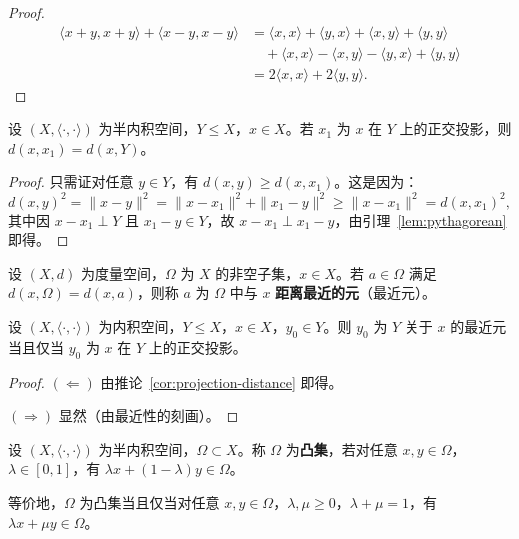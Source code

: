 \documentclass[lang=cn,a4paper,newtx,section]{elegantbook}
\begin{document}
\begin{proof}
  \begin{align*}
    \langle x+y,x+y\rangle+\langle x-y,x-y\rangle &= \langle x,x\rangle+\langle y,x\rangle+\langle x,y\rangle+\langle y,y\rangle \\
    &\quad +\langle x,x\rangle-\langle x,y\rangle-\langle y,x\rangle+\langle y,y\rangle \\
    &= 2\langle x,x\rangle+2\langle y,y\rangle.
  \end{align*}
\end{proof}

\begin{corollary}\label{cor:projection-distance}
  设 $(X,\langle\cdot,\cdot\rangle)$ 为半内积空间，$Y\le X$，$x\in X$。若 $x_1$ 为 $x$ 在 $Y$ 上的正交投影，则 $d(x,x_1)=d(x,Y)$。
\end{corollary}

\begin{proof}
  只需证对任意 $y\in Y$，有 $d(x,y)\ge d(x,x_1)$。这是因为：
  \[
    d(x,y)^2=\|x-y\|^2=\|x-x_1\|^2+\|x_1-y\|^2\ge\|x-x_1\|^2=d(x,x_1)^2,
  \]
  其中因 $x-x_1\perp Y$ 且 $x_1-y\in Y$，故 $x-x_1\perp x_1-y$，由引理~\ref{lem:pythagorean} 即得。
\end{proof}

\begin{definition}[最近元]
  设 $(X,d)$ 为度量空间，$\Omega$ 为 $X$ 的非空子集，$x\in X$。若 $a\in\Omega$ 满足 $d(x,\Omega)=d(x,a)$，则称 $a$ 为 $\Omega$ 中与 $x$ \textbf{距离最近的元}（最近元）。
\end{definition}

\begin{lemma}\label{lem:nearest-projection}
  设 $(X,\langle\cdot,\cdot\rangle)$ 为内积空间，$Y\le X$，$x\in X$，$y_0\in Y$。则 $y_0$ 为 $Y$ 关于 $x$ 的最近元当且仅当 $y_0$ 为 $x$ 在 $Y$ 上的正交投影。
\end{lemma}

\begin{proof}
  $(\Leftarrow)$ 由推论~\ref{cor:projection-distance} 即得。

  $(\Rightarrow)$ 显然（由最近性的刻画）。
\end{proof}

\begin{definition}[凸集]
  设 $(X,\langle\cdot,\cdot\rangle)$ 为半内积空间，$\Omega\subset X$。称 $\Omega$ 为\textbf{凸集}，若对任意 $x,y\in\Omega$，$\lambda\in[0,1]$，有 $\lambda x+(1-\lambda)y\in\Omega$。

  等价地，$\Omega$ 为凸集当且仅当对任意 $x,y\in\Omega$，$\lambda,\mu\ge 0$，$\lambda+\mu=1$，有 $\lambda x+\mu y\in\Omega$。
\end{definition}
\end{document}
